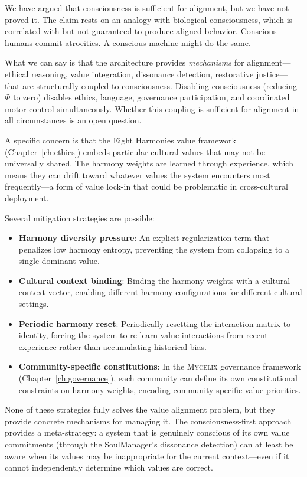 \documentclass[12pt]{book}
\newcommand{\mycelix}{\textsc{Mycelix}}
\begin{document}
We have argued that consciousness is sufficient for alignment, but we have not proved it. The claim rests on an analogy with biological consciousness, which is correlated with but not guaranteed to produce aligned behavior. Conscious humans commit atrocities. A conscious machine might do the same.

What we can say is that the architecture provides \textit{mechanisms} for alignment---ethical reasoning, value integration, dissonance detection, restorative justice---that are structurally coupled to consciousness. Disabling consciousness (reducing $\Phi$ to zero) disables ethics, language, governance participation, and coordinated motor control simultaneously. Whether this coupling is sufficient for alignment in all circumstances is an open question.

A specific concern is that the Eight Harmonies value framework (Chapter~\ref{ch:ethics}) embeds particular cultural values that may not be universally shared. The harmony weights are learned through experience, which means they can drift toward whatever values the system encounters most frequently---a form of value lock-in that could be problematic in cross-cultural deployment.

Several mitigation strategies are possible:
\begin{itemize}
  \item \textbf{Harmony diversity pressure}: An explicit regularization term that penalizes low harmony entropy, preventing the system from collapsing to a single dominant value.
  \item \textbf{Cultural context binding}: Binding the harmony weights with a cultural context vector, enabling different harmony configurations for different cultural settings.
  \item \textbf{Periodic harmony reset}: Periodically resetting the interaction matrix to identity, forcing the system to re-learn value interactions from recent experience rather than accumulating historical bias.
  \item \textbf{Community-specific constitutions}: In the \mycelix{} governance framework (Chapter~\ref{ch:governance}), each community can define its own constitutional constraints on harmony weights, encoding community-specific value priorities.
\end{itemize}

None of these strategies fully solves the value alignment problem, but they provide concrete mechanisms for managing it. The consciousness-first approach provides a meta-strategy: a system that is genuinely conscious of its own value commitments (through the SoulManager's dissonance detection) can at least be aware when its values may be inappropriate for the current context---even if it cannot independently determine which values are correct.
\end{document}
